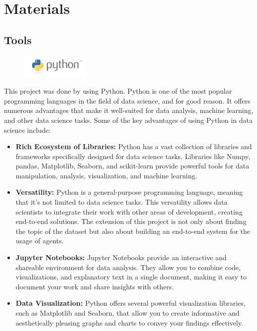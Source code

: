 \section{Materials}

\subsection{Tools}

\begin{figure}[H]
    \centering
    \includegraphics[width=0.3\textwidth]{images/python.png}
    \label{fig:python_logo}
\end{figure}

This project was done by using Python. Python is one of the most popular programming languages in the field of data science, and for good reason. It offers numerous advantages that make it well-suited for data analysis, machine learning, and other data science tasks. Some of the key advantages of using Python in data science include:

\begin{itemize}
    \item \textbf{Rich Ecosystem of Libraries:} Python has a vast collection of libraries and frameworks specifically designed for data science tasks. Libraries like Numpy\cite{harris2020array}, pandas\cite{mckinney-proc-scipy-2010}, Matplotlib\cite{Hunter:2007}, Seaborn, and scikit-learn\cite{scikit-learn} provide powerful tools for data manipulation, analysis, visualization, and machine learning.
    \item \textbf{Versatility:}  Python is a general-purpose programming language, meaning that it's not limited to data science tasks. This versatility allows data scientists to integrate their work with other areas of development, creating end-to-end solutions. The extension of this project is not only about finding the topic of the dataset but also about building an end-to-end system for the usage of agents.
    \item \textbf{Jupyter Notebooks:}  Jupyter Notebooks\cite{Kluyver2016jupyter} provide an interactive and shareable environment for data analysis. They allow you to combine code, visualizations, and explanatory text in a single document, making it easy to document your work and share insights with others.
    \item \textbf{Data Visualization:}  Python offers several powerful visualization libraries, such as Matplotlib and Seaborn, that allow you to create informative and aesthetically pleasing graphs and charts to convey your findings effectively.
\end{itemize}

